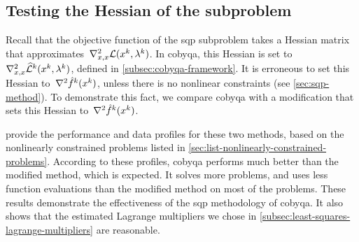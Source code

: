 \subsection{Testing the Hessian of the  subproblem}

Recall that the objective function of the \gls{sqp} subproblem takes a Hessian matrix that approximates~$\nabla_{x, x}^2 \lag(\iter[k], \lm[k])$.
In \gls{cobyqa}, this Hessian is set to~$\nabla_{x, x}^2 \lagm[k](\iter[k], \lm[k])$, defined in \cref{subsec:cobyqa-framework}.
It is erroneous to set this Hessian to~$\nabla^2 \objm[k](\iter[k])$, unless there is no nonlinear constraints (see \cref{sec:sqp-method}).
To demonstrate this fact, we compare \gls{cobyqa} with a modification that sets this Hessian to~$\nabla^2 \objm[k](\iter[k])$.

 provide the performance and data profiles for these two methods, based on the nonlinearly constrained problems listed in \cref{sec:list-nonlinearly-constrained-problems}.
According to these profiles, \gls{cobyqa} performs much better than the modified method, which is expected.
It solves more problems, and uses less function evaluations than the modified method on most of the problems.
These results demonstrate the effectiveness of the \gls{sqp} methodology of \gls{cobyqa}.
It also shows that the estimated Lagrange multipliers we chose in \cref{subsec:least-squares-lagrange-multipliers} are reasonable.

